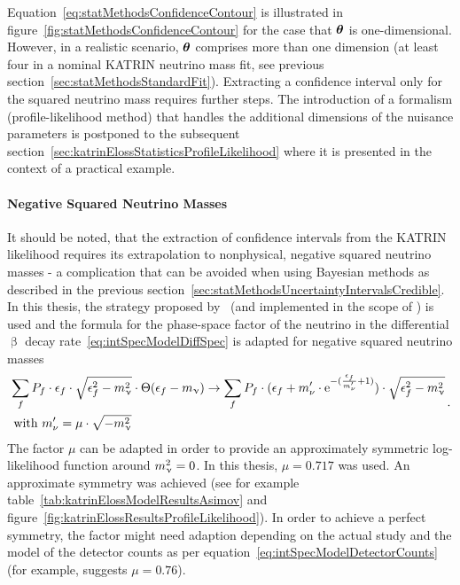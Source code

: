 Equation~\eqref{eq:statMethodsConfidenceContour} is illustrated in figure~\ref{fig:statMethodsConfidenceContour} for the case that $\boldsymbol{\mathbf{\theta}}$ is one-dimensional. However, in a realistic scenario, $\boldsymbol{\mathbf{\theta}}$ comprises more than one dimension (at least four in a nominal KATRIN neutrino mass fit, see previous section~\ref{sec:statMethodsStandardFit}). Extracting a confidence interval only for the squared neutrino mass requires further steps. The introduction of a formalism (profile-likelihood method) that handles the additional dimensions of the nuisance parameters is postponed to the subsequent section~\ref{sec:katrinElossStatisticsProfileLikelihood} where it is presented in the context of a practical example.

\paragraph{Negative Squared Neutrino Masses}
It should be noted, that the extraction of confidence intervals from the KATRIN likelihood requires its extrapolation to nonphysical, negative squared neutrino masses - a complication that can be avoided when using Bayesian methods as described in the previous section~\ref{sec:statMethodsUncertaintyIntervalsCredible}. In this thesis, the strategy proposed by~\cite{WEINHEIMER1993} (and implemented in the scope of \cite{Kleesiek2014}) is used and the formula for the phase-space factor of the neutrino in the differential $\upbeta$ decay rate~\eqref{eq:intSpecModelDiffSpec} is adapted for negative squared neutrino masses
\begin{equation}
\begin{split}
&\sum_{f} 
P_f \cdot 
\epsilon_f \cdot 
\sqrt{\epsilon_f^2-m_\upnu^2} \cdot 
\Theta(\epsilon_f-m_\upnu)
\rightarrow
\sum_{f} 
P_f \cdot 
(
	\epsilon_f + 
	m_\nu^\prime\cdot 
	\mathrm{e}^{-(\frac{\epsilon_f}{m_\nu^\prime}+1)}	
) \cdot 
\sqrt{\epsilon_f^2-m_\upnu^2} \\
&\text{ with } m_\nu^\prime = \mu \cdot \sqrt{-m_\upnu^2}
\end{split}
\text{\,.}
\end{equation}
The factor $\mu$ can be adapted in order to provide an approximately symmetric log-likelihood function around $m_\upnu^2=0$. In this thesis, $\mu=0.717$ was used. An approximate symmetry was achieved (see for example table~\ref{tab:katrinElossModelResultsAsimov} and figure~\ref{fig:katrinElossResultsProfileLikelihood}). In order to achieve a perfect symmetry, the factor might need adaption depending on the actual study and the model of the detector counts as per equation~\eqref{eq:intSpecModelDetectorCounts} (for example, \cite{WEINHEIMER1993} suggests $\mu=0.76$).

